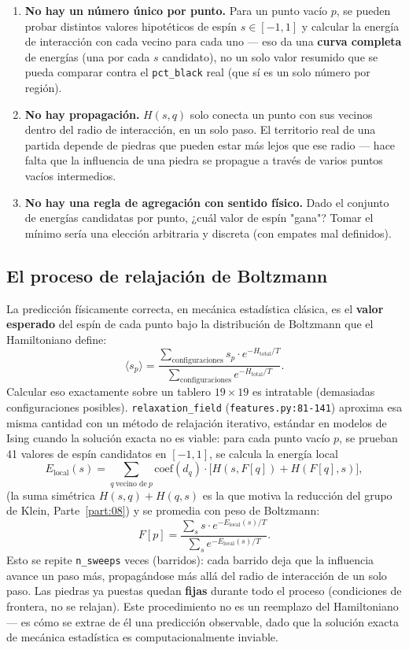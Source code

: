 \documentclass[11pt, a4paper]{article}
\begin{document}
\begin{enumerate}
  \item \textbf{No hay un n\'umero \'unico por punto.} Para un punto
  vac\'io $p$, se pueden probar distintos valores hipot\'eticos de
  esp\'in $s\in[-1,1]$ y calcular la energ\'ia de interacci\'on con
  cada vecino para cada uno --- eso da una \textbf{curva completa} de
  energ\'ias (una por cada $s$ candidato), no un solo valor resumido
  que se pueda comparar contra el \texttt{pct\_black} real (que s\'i es
  un solo n\'umero por regi\'on).
  \item \textbf{No hay propagaci\'on.} $H(s,q)$ solo conecta un punto
  con sus vecinos dentro del radio de interacci\'on, en un solo paso.
  El territorio real de una partida depende de piedras que pueden estar
  m\'as lejos que ese radio --- hace falta que la influencia de una
  piedra se propague a trav\'es de varios puntos vac\'ios intermedios.
  \item \textbf{No hay una regla de agregaci\'on con sentido f\'isico.}
  Dado el conjunto de energ\'ias candidatas por punto, ¿cu\'al valor de
  esp\'in "gana"? Tomar el m\'inimo ser\'ia una elecci\'on arbitraria y
  discreta (con empates mal definidos).
\end{enumerate}

\subsection{El proceso de relajaci\'on de Boltzmann}
\label{sec:mecanismo-relajacion}

La predicci\'on f\'isicamente correcta, en mec\'anica estad\'istica
cl\'asica, es el \textbf{valor esperado} del esp\'in de cada punto bajo
la distribuci\'on de Boltzmann que el Hamiltoniano define:
\[
\langle s_p \rangle = \frac{\sum_{\text{configuraciones}} s_p\cdot
e^{-H_{\text{total}}/T}}{\sum_{\text{configuraciones}} e^{-H_{\text{total}}/T}}.
\]
Calcular eso exactamente sobre un tablero $19\times19$ es intratable
(demasiadas configuraciones posibles). \texttt{relaxation\_field}
(\texttt{features.py:81-141}) aproxima esa misma cantidad con un
m\'etodo de relajaci\'on iterativo, est\'andar en modelos de Ising
cuando la soluci\'on exacta no es viable: para cada punto vac\'io $p$,
se prueban 41 valores de esp\'in candidatos en $[-1,1]$, se calcula la
energ\'ia local
\[
E_{\text{local}}(s) = \sum_{q\ \text{vecino de}\ p} \text{coef}(d_q)\cdot
\bigl[H(s,F[q]) + H(F[q],s)\bigr],
\]
(la suma sim\'etrica $H(s,q)+H(q,s)$ es la que motiva la reducci\'on
del grupo de Klein, Parte~\ref{part:08}) y se promedia con peso de
Boltzmann:
\[
F[p] = \frac{\sum_s s\cdot e^{-E_{\text{local}}(s)/T}}{\sum_s e^{-E_{\text{local}}(s)/T}}.
\]
Esto se repite \texttt{n\_sweeps} veces (barridos): cada barrido deja
que la influencia avance un paso m\'as, propag\'andose m\'as all\'a del
radio de interacci\'on de un solo paso. Las piedras ya puestas quedan
\textbf{fijas} durante todo el proceso (condiciones de frontera, no se
relajan). Este procedimiento no es un reemplazo del Hamiltoniano ---
es c\'omo se extrae de \'el una predicci\'on observable, dado que la
soluci\'on exacta de mec\'anica estad\'istica es computacionalmente
inviable.
\end{document}
